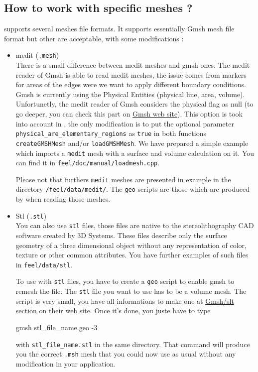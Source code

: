 %

\subsection{How to work with specific meshes ?}
\label{howto:spec-meshes}
\feel supports several meshes file formats. It supports essentially Gmsh mesh file format but other are acceptable,  with some modifications :
\begin{itemize}

\item medit (\lstinline!.mesh!) \\
There is a small difference between medit meshes and gmsh ones. The medit reader of Gmsh is able to read medit meshes, the issue comes from markers for areas of the edges were we want to apply different boundary conditions. Gmsh is currently using the Physical Entities (physical line, area, volume). Unfortunetly, the medit reader of Gmsh considers the physical flag as null (to go deeper, you can check this part on \href{http://geuz.org/gmsh/doc/texinfo/gmsh.html#Elementary-vs-physical-entities}{Gmsh web site}). This option is took into account in \feel, the only modification is to put the optional parameter \lstinline!physical_are_elementary_regions! as \lstinline!true! in both functions \lstinline!createGMSHMesh! and/or \lstinline!loadGMSHMesh!. We have prepared a simple example which imports a \lstinline!medit! mesh with a surface and volume calculation on it. You can find it in \lstinline!feel/doc/manual/loadmesh.cpp!.

Please not that furthers \lstinline!medit! meshes are presented in example in the directory \lstinline!/feel/data/medit/!. The \lstinline!geo! scripts are those which are produced by \feel when reading those meshes.

\item Stl (\lstinline!.stl!) \\
You can also use \lstinline!stl! files, those files are native to the stereolithography CAD software created by 3D Systems. These files describe only the surface geometry of a three dimensional object without any representation of color, texture or other common attributes. You have further examples of such files in \lstinline!feel/data/stl!.

To use \feel with \lstinline!stl! files, you have to create a \lstinline!geo! script to enable gmsh to remesh the file. The \lstinline!stl! file you want to use has to be a volume mesh. The script is very small, you have all informations to make one at \href{https://geuz.org/trac/gmsh/wiki/STLRemeshing}{Gmsh/slt section} on their web site. Once it's done, you juste have to type
\begin{unixcom}
		gmsh stl_file_name.geo -3
\end{unixcom}
with \lstinline!stl_file_name.stl! in the same directory. That command will produce you the correct \lstinline!.msh! mesh that you could now use as usual without any modification in your \feel application.


\end{itemize}
